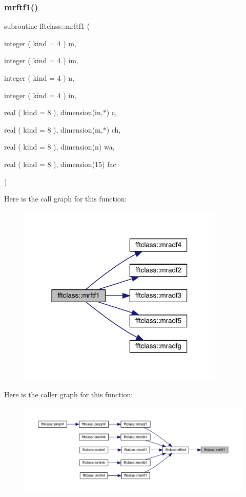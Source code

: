 \subsubsection{\texorpdfstring{mrftf1()}{mrftf1()}}
{\footnotesize\ttfamily subroutine fftclass\+::mrftf1 (\begin{DoxyParamCaption}\item[{integer ( kind = 4 )}]{m,  }\item[{integer ( kind = 4 )}]{im,  }\item[{integer ( kind = 4 )}]{n,  }\item[{integer ( kind = 4 )}]{in,  }\item[{real ( kind = 8 ), dimension(in,$\ast$)}]{c,  }\item[{real ( kind = 8 ), dimension(m,$\ast$)}]{ch,  }\item[{real ( kind = 8 ), dimension(n)}]{wa,  }\item[{real ( kind = 8 ), dimension(15)}]{fac }\end{DoxyParamCaption})}

Here is the call graph for this function\+:\nopagebreak
\begin{figure}[H]
\begin{center}
\leavevmode
\includegraphics[width=278pt]{namespacefftclass_a5b17cd46c9d021ed6dfe9499fc802b3f_cgraph}
\end{center}
\end{figure}
Here is the caller graph for this function\+:\nopagebreak
\begin{figure}[H]
\begin{center}
\leavevmode
\includegraphics[width=350pt]{namespacefftclass_a5b17cd46c9d021ed6dfe9499fc802b3f_icgraph}
\end{center}
\end{figure}
\mbox{\label{namespacefftclass_a88a3f7fd420d15d4e4d603d4d8ebf38e}} 
